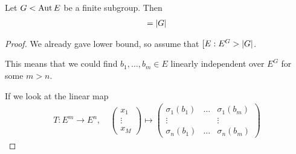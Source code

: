 \begin{prop}[]\label{prop:4-9}
  Let $G < \operatorname{Aut} E$ be a finite subgroup. Then
  \begin{align*}
    [E:E^{G}] = \abs{G}
  \end{align*}
\end{prop}
\begin{proof}
  We already gave lower bound, so assume that $[E:E^{G} > \vert G\vert$.

  This means that we could find $b_{1}, \ldots, b_{m} \in E$ linearly independent over $E^{G}$ for some $m > n$.

  If we look at the linear map
  \begin{align*}
    T: E^{m} \to E^{n}, \quad \begin{pmatrix}
    x_1\\
    \vdots\\
    x_M
    \end{pmatrix}
    \mapsto 
    \begin{pmatrix}
      \sigma_1(b_1) & \ldots & \sigma_1(b_m)\\
    \vdots &  & \vdots\\
    \sigma_n(b_1) & \ldots & \sigma_n(b_m)
    \end{pmatrix}
  \end{align*}
\end{proof}
